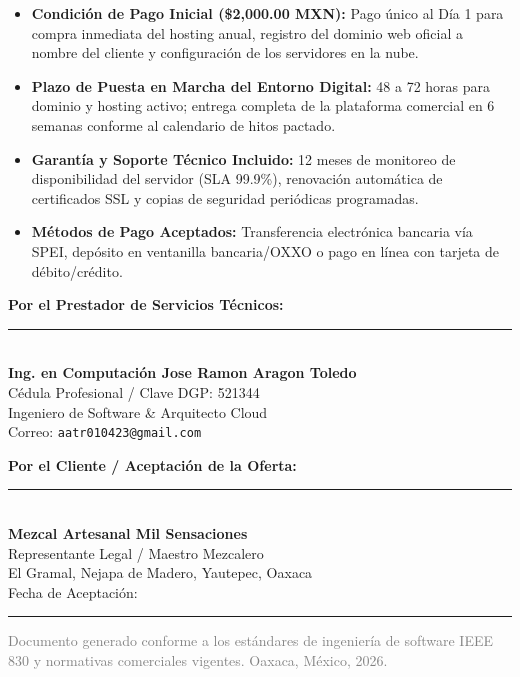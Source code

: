\documentclass[11pt,letterpaper]{article}
\begin{document}
\footnotesize
\begin{itemize}[leftmargin=1.0cm,itemsep=2.5pt]
    \item \textbf{Condición de Pago Inicial (\$2,000.00 MXN):} Pago único al Día 1 para compra inmediata del hosting anual, registro del dominio web oficial a nombre del cliente y configuración de los servidores en la nube.
    \item \textbf{Plazo de Puesta en Marcha del Entorno Digital:} 48 a 72 horas para dominio y hosting activo; entrega completa de la plataforma comercial en 6 semanas conforme al calendario de hitos pactado.
    \item \textbf{Garantía y Soporte Técnico Incluido:} 12 meses de monitoreo de disponibilidad del servidor (SLA 99.9\%), renovación automática de certificados SSL y copias de seguridad periódicas programadas.
    \item \textbf{Métodos de Pago Aceptados:} Transferencia electrónica bancaria vía SPEI, depósito en ventanilla bancaria/OXXO o pago en línea con tarjeta de débito/crédito.
\end{itemize}

\vspace{0.6cm}

\noindent
\begin{minipage}[t]{0.48\textwidth}
    \centering
    \textbf{Por el Prestador de Servicios Técnicos:}\\[1.3cm]
    \rule{0.85\textwidth}{0.5pt}\\
    \textbf{Ing. en Computación Jose Ramon Aragon Toledo}\\
    Cédula Profesional / Clave DGP: 521344\\
    Ingeniero de Software \& Arquitecto Cloud\\
    Correo: \texttt{aatr010423@gmail.com}
\end{minipage}
\hfill
\begin{minipage}[t]{0.48\textwidth}
    \centering
    \textbf{Por el Cliente / Aceptación de la Oferta:}\\[1.3cm]
    \rule{0.85\textwidth}{0.5pt}\\
    \textbf{Mezcal Artesanal Mil Sensaciones}\\
    Representante Legal / Maestro Mezcalero\\
    El Gramal, Nejapa de Madero, Yautepec, Oaxaca\\
    Fecha de Aceptación: \rule{3.0cm}{0.4pt}
\end{minipage}

\vspace{0.4cm}

\begin{center}
    \tiny\textcolor{gray}{Documento generado conforme a los estándares de ingeniería de software IEEE 830 y normativas comerciales vigentes. Oaxaca, México, 2026.}
\end{center}
\end{document}

